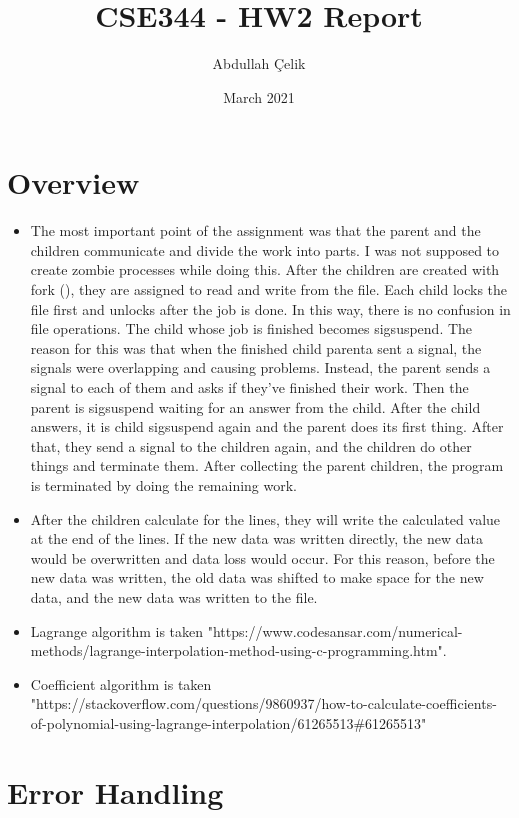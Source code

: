 \documentclass{article}
\title{CSE344 - HW2 Report}
\author{Abdullah Çelik}
\date{March 2021}
\begin{document}
\maketitle

\section{Overview}
\begin{itemize}
    \item The most important point of the assignment was that the parent and the children communicate and divide the work into parts. I was not supposed to create zombie processes while doing this. After the children are created with fork (), they are assigned to read and write from the file. Each child locks the file first and unlocks after the job is done. In this way, there is no confusion in file operations. The child whose job is finished becomes sigsuspend. The reason for this was that when the finished child parenta sent a signal, the signals were overlapping and causing problems. Instead, the parent sends a signal to each of them and asks if they've finished their work. Then the parent is sigsuspend waiting for an answer from the child. After the child answers, it is child sigsuspend again and the parent does its first thing. After that, they send a signal to the children again, and the children do other things and terminate them. After collecting the parent children, the program is terminated by doing the remaining work.
    \item After the children calculate for the lines, they will write the calculated value at the end of the lines. If the new data was written directly, the new data would be overwritten and data loss would occur. For this reason, before the new data was written, the old data was shifted to make space for the new data, and the new data was written to the file.
    \item Lagrange algorithm is taken "https://www.codesansar.com/numerical-methods/lagrange-interpolation-method-using-c-programming.htm".
    \item Coefficient algorithm is taken "https://stackoverflow.com/questions/9860937/how-to-calculate-coefficients-of-polynomial-using-lagrange-interpolation/61265513\#61265513"
\end{itemize}

\newpage

\section{Error Handling}
\end{document}
